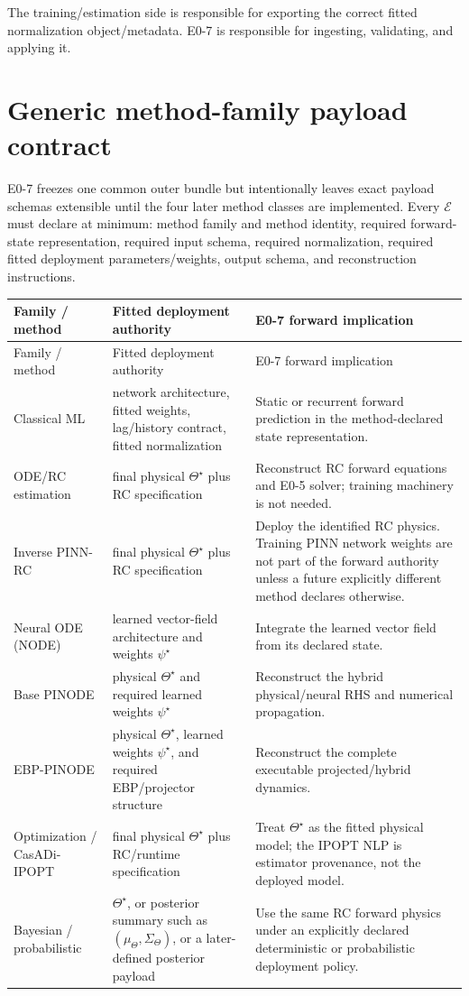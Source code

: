 \documentclass[11pt]{article}
\newcommand{\Exec}{\mathcal{E}}
\begin{document}
The training/estimation side is responsible for exporting the correct fitted
normalization object/metadata. E0-7 is responsible for ingesting, validating,
and applying it.

\section{Generic method-family payload contract}

E0-7 freezes one common outer bundle but intentionally leaves exact payload
schemas extensible until the four later method classes are implemented. Every
$\Exec$ must declare at minimum: method family and method identity, required
forward-state representation, required input schema, required normalization,
required fitted deployment parameters/weights, output schema, and reconstruction
instructions.

\begin{longtable}{p{}p{}p{}}
\toprule
Family / method & Fitted deployment authority & E0-7 forward implication\\
\midrule
\endfirsthead
\toprule
Family / method & Fitted deployment authority & E0-7 forward implication\\
\midrule
\endhead
Classical ML & network architecture, fitted weights, lag/history contract, fitted normalization & Static or recurrent forward prediction in the method-declared state representation.\\
ODE/RC estimation & final physical $\Theta^\star$ plus RC specification & Reconstruct RC forward equations and E0-5 solver; training machinery is not needed.\\
Inverse PINN-RC & final physical $\Theta^\star$ plus RC specification & Deploy the identified RC physics. Training PINN network weights are not part of the forward authority unless a future explicitly different method declares otherwise.\\
Neural ODE (NODE) & learned vector-field architecture and weights $\psi^\star$ & Integrate the learned vector field from its declared state.\\
Base PINODE & physical $\Theta^\star$ and required learned weights $\psi^\star$ & Reconstruct the hybrid physical/neural RHS and numerical propagation.\\
EBP-PINODE & physical $\Theta^\star$, learned weights $\psi^\star$, and required EBP/projector structure & Reconstruct the complete executable projected/hybrid dynamics.\\
Optimization / CasADi-IPOPT & final physical $\Theta^\star$ plus RC/runtime specification & Treat $\Theta^\star$ as the fitted physical model; the IPOPT NLP is estimator provenance, not the deployed model.\\
Bayesian / probabilistic & $\Theta^\star$, or posterior summary such as $(\mu_\Theta,\Sigma_\Theta)$, or a later-defined posterior payload & Use the same RC forward physics under an explicitly declared deterministic or probabilistic deployment policy.\\
\bottomrule
\end{longtable}
\end{document}

